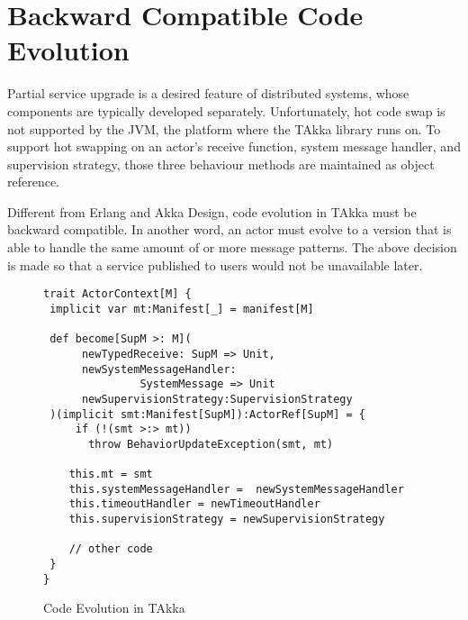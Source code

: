 \begin{comment}
\section{Mixing Static and Dynamic Type Checking}

Implementing {\bf ActorContext} described as \S\ref{actor_context} requires a
mixture of static and dynamic type checking.  This section looks into how
static and dynamic type checking are combined to guarantee backward compatible
code evolution and support type safe data retrieval.

\subsection{Backward Compatible Code Evolution}
\end{comment}
\section{Backward Compatible Code Evolution}
\label{code_evolution}

Partial service upgrade is a desired feature of distributed systems, whose
components are typically developed separately. Unfortunately, hot code swap is
not supported by the JVM, the platform where the TAkka library runs on.  To
support hot swapping on an actor's receive function, system message handler, and
supervision strategy, those three behaviour methods are maintained as object
reference.

Different from Erlang and Akka Design, code evolution in TAkka must be backward
compatible.  In another word, an actor must evolve to a version that is able to
handle the same amount of or more message patterns.  The above decision is made
so that a service published to users would not be unavailable later.

\begin{figure}[h]
\label{become}
\begin{lstlisting}
trait ActorContext[M] {
 implicit var mt:Manifest[_] = manifest[M]

 def become[SupM >: M](
      newTypedReceive: SupM => Unit,
      newSystemMessageHandler:
               SystemMessage => Unit
      newSupervisionStrategy:SupervisionStrategy
 )(implicit smt:Manifest[SupM]):ActorRef[SupM] = {
     if (!(smt >:> mt))
       throw BehaviorUpdateException(smt, mt)

    this.mt = smt
    this.systemMessageHandler =  newSystemMessageHandler
    this.timeoutHandler = newTimeoutHandler
    this.supervisionStrategy = newSupervisionStrategy

    // other code
 }
}
\end{lstlisting}
\caption{Code Evolution in TAkka}
\end{figure}


